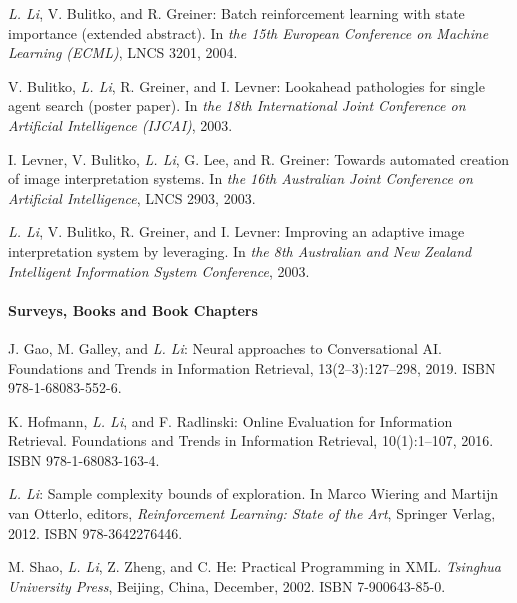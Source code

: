 \documentclass[10pt,twoside,letterpaper]{article}
\newcommand{\selffont}[1]{{\textit{#1}}}
\newcommand{\venuefont}[1]{{\textit{#1}}}
\newcommand{\negitemspace}{\vspace{1mm}}
\newcommand{\myself}{\selffont{L. Li}}
\begin{document}
\begin{compactenum}[(C1)]
\item{\myself, V. Bulitko, and R. Greiner: Batch reinforcement learning with state importance (extended abstract).  In \venuefont{the 15th European Conference on Machine Learning (ECML)}, LNCS 3201, 2004.}

\item{V. Bulitko, \myself, R. Greiner, and I. Levner: Lookahead pathologies for single agent search (poster paper). In \venuefont{the 18th International Joint Conference on Artificial Intelligence (IJCAI)}, 2003.}

\item{I. Levner, V. Bulitko, \myself, G. Lee, and R. Greiner: Towards automated creation of image interpretation systems. In \venuefont{the 16th Australian Joint Conference on Artificial
Intelligence}, LNCS 2903, 2003.}

\item{\myself, V. Bulitko, R. Greiner, and I. Levner: Improving an adaptive image interpretation system by leveraging. In \venuefont{the 8th Australian and New Zealand Intelligent Information System Conference}, 2003.}

\end{compactenum} \negitemspace

\paragraph{Surveys, Books and Book Chapters} \negitemspace

\begin{compactenum}[(B1)]

\item{J. Gao, M. Galley, and \myself: Neural approaches to
Conversational AI.  Foundations and Trends in Information Retrieval, 13(2--3):127--298, 2019.  ISBN 978-1-68083-552-6.}

\item{K. Hofmann, \myself, and F. Radlinski: Online Evaluation for Information Retrieval.  Foundations and Trends in Information Retrieval, 10(1):1--107, 2016. ISBN 978-1-68083-163-4.}

\item{\myself: Sample complexity bounds of exploration.  In Marco Wiering and Martijn van Otterlo, editors, \venuefont{Reinforcement Learning: State of the Art}, Springer Verlag, 2012.  ISBN 978-3642276446.}

\item{M. Shao, \myself, Z. Zheng, and C. He: Practical
Programming in XML. \venuefont{Tsinghua University Press}, Beijing,
China, December, 2002. ISBN 7-900643-85-0.}

\end{compactenum} \negitemspace
\end{document}
